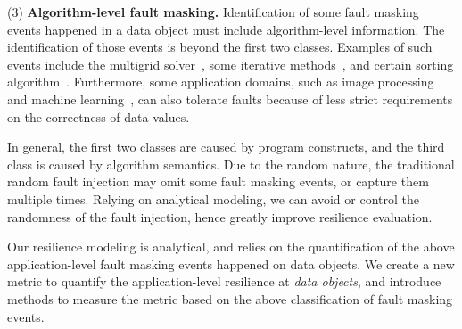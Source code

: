 (3) \textbf{Algorithm-level fault masking.}
Identification of some fault masking events happened in a data object must include algorithm-level information.
The identification of those events is beyond the first two classes.
Examples of such events include %
the multigrid solver~\cite{mg_ics12}, some iterative methods~\cite{2-shantharam2011characterizing}, and certain sorting algorithm~\cite{prdc13:sharma}.  
Furthermore, some application domains, such as image processing and machine learning~\cite{isca07:li}, can also tolerate faults because of less 
strict requirements on the correctness of data values. 

In general, the first two classes are caused by program constructs, and the third class is caused by algorithm semantics. Due to the random nature, 
the traditional random fault injection may omit some fault masking events, or capture them multiple times.
Relying on analytical modeling, we can avoid or control the randomness of the fault injection, hence greatly improve resilience evaluation. %

Our resilience modeling is analytical, and %
relies on the quantification of the above application-level fault masking events happened on data objects.
We create a new metric to quantify the application-level resilience at \textit{data objects}, and introduce methods to measure the metric based on the above classification of fault masking events.

\vspace{-10pt}
